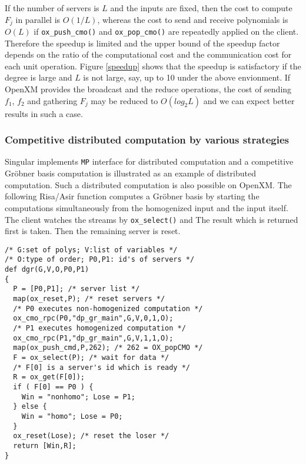 If the number of servers is $L$ and the inputs are fixed, then the cost to
compute $F_j$ in parallel is $O(1/L)$, whereas the cost
to send and receive polynomials is $O(L)$ if {\tt ox\_push\_cmo()} and
{\tt ox\_pop\_cmo()} are repeatedly applied on the client.
Therefore the speedup is limited and the upper bound of
the speedup factor depends on the ratio of 
the computational cost and the communication cost for each unit operation.
Figure \ref{speedup} shows that 
the speedup is satisfactory if the degree is large and $L$
is not large, say, up to 10 under the above envionment.
If OpenXM provides the broadcast and the reduce operations, the cost of 
sending $f_1$, $f_2$ and gathering $F_j$ may be reduced to $O(log_2L)$
and we can expect better results in such a case.

\subsubsection{Competitive distributed computation by various strategies}

Singular \cite{Singular} implements {\tt MP} interface for distributed
computation and a competitive Gr\"obner basis computation is
illustrated as an example of distributed computation.
Such a distributed computation is also possible on OpenXM.
The following Risa/Asir function computes a Gr\"obner basis by
starting the computations simultaneously from the homogenized input and
the input itself.  The client watches the streams by {\tt ox\_select()}
and The result which is returned first is taken. Then the remaining
server is reset.

\begin{verbatim}
/* G:set of polys; V:list of variables */
/* O:type of order; P0,P1: id's of servers */
def dgr(G,V,O,P0,P1)
{
  P = [P0,P1]; /* server list */
  map(ox_reset,P); /* reset servers */
  /* P0 executes non-homogenized computation */
  ox_cmo_rpc(P0,"dp_gr_main",G,V,0,1,O);
  /* P1 executes homogenized computation */
  ox_cmo_rpc(P1,"dp_gr_main",G,V,1,1,O);
  map(ox_push_cmd,P,262); /* 262 = OX_popCMO */
  F = ox_select(P); /* wait for data */
  /* F[0] is a server's id which is ready */
  R = ox_get(F[0]);
  if ( F[0] == P0 ) {
    Win = "nonhomo"; Lose = P1;
  } else {
    Win = "homo"; Lose = P0;
  }
  ox_reset(Lose); /* reset the loser */
  return [Win,R];
}
\end{verbatim}
